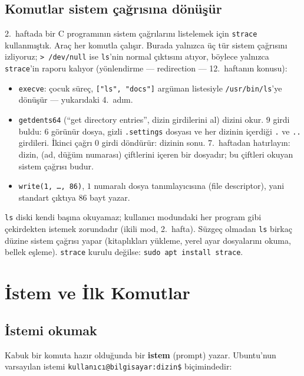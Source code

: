 \documentclass[11pt,a4paper]{article}
\newcommand{\term}[1]{\textbf{\color{mintdeep}#1}}
\newcommand{\cmd}[1]{\texttt{#1}}
\begin{document}
\subsection{Komutlar sistem çağrısına dönüşür}

2.\ haftada bir C programının sistem çağrılarını listelemek için \cmd{strace} kullanmıştık. Araç her komutla çalışır. Burada yalnızca üç tür sistem çağrısını izliyoruz; \texttt{> /dev/null} ise \cmd{ls}'nin normal çıktısını atıyor, böylece yalnızca \cmd{strace}'in raporu kalıyor (yönlendirme --- redirection --- 12.\ haftanın konusu):


\begin{itemize}
  \item \texttt{execve}: çocuk süreç, \texttt{["ls", "docs"]} argüman listesiyle \texttt{/usr/bin/ls}'ye dönüşür --- yukarıdaki 4.\ adım.
  \item \texttt{getdents64} (``get directory entries'', dizin girdilerini al) dizini okur. $9$ girdi buldu: $6$ görünür dosya, gizli \texttt{.settings} dosyası ve her dizinin içerdiği \texttt{.} ve \texttt{..} girdileri. İkinci çağrı $0$ girdi döndürür: dizinin sonu. 7.\ haftadan hatırlayın: dizin, (ad, düğüm numarası) çiftlerini içeren bir dosyadır; bu çiftleri okuyan sistem çağrısı budur.
  \item \texttt{write(1, \ldots, 86)}, $1$ numaralı dosya tanımlayıcısına (file descriptor), yani standart çıktıya $86$ bayt yazar.
\end{itemize}
\cmd{ls} diski kendi başına okuyamaz; kullanıcı modundaki her program gibi çekirdekten istemek zorundadır (ikili mod, 2.\ hafta). Süzgeç olmadan \cmd{ls} birkaç düzine sistem çağrısı yapar (kitaplıkları yükleme, yerel ayar dosyalarını okuma, bellek eşleme). \cmd{strace} kurulu değilse: \cmd{sudo apt install strace}.

\section{İstem ve İlk Komutlar}

\subsection{İstemi okumak}

Kabuk bir komuta hazır olduğunda bir \term{istem} (prompt) yazar. Ubuntu'nun varsayılan istemi \texttt{kullanıcı@bilgisayar:dizin\$} biçimindedir:
\end{document}
